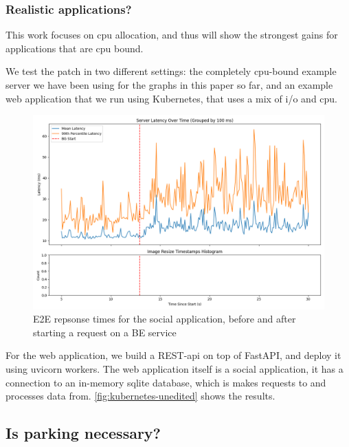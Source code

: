 \subsubsection{Realistic applications?}

This work focuses on cpu allocation, and thus will show the strongest gains for
applications that are cpu bound. 

We test the patch in two different settings: the completely cpu-bound example
server we have been using for the graphs in this paper so far, and an example
web application that we run using Kubernetes, that uses a mix of i/o and cpu.

\begin{figure}[t]
    \centering
    \includegraphics[width=\columnwidth]{graphs/kubernetes-unedited.png}
    \caption{E2E repsonse times for the social application, before and after
    starting a request on a BE service}\label{fig:kubernetes-unedited}
\end{figure}

For the web application, we build a REST-api on top of FastAPI, and deploy it
using uvicorn workers. The web application itself is a social application, it
has a connection to an in-memory sqlite database, which is makes requests to and
processes data from. \autoref{fig:kubernetes-unedited} shows the results.

\subsection{Is parking necessary?}

